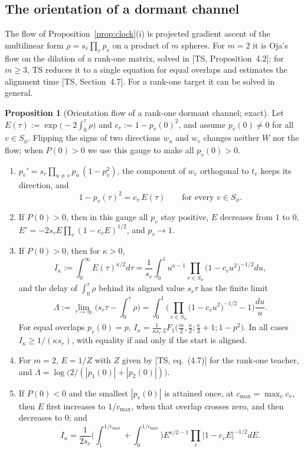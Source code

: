 \documentclass[11pt]{article}
\newcommand{\TS}{\textsf{TS}}
\newcommand{\ts}[1]{[\TS, #1]}
\theoremstyle{definition}
\newtheorem{proposition}[theorem]{Proposition}
\numberwithin{equation}{section}
\begin{document}
\subsection{The orientation of a dormant channel}

The flow of Proposition~\ref{prop:clock}(i) is projected gradient ascent of the multilinear form $\rho=s_r\prod_vp_v$ on a product of $m$ spheres. For $m=2$ it is Oja's flow on the dilation of a rank-one matrix, solved in \ts{Proposition~4.2}; for $m\ge3$, \TS{} reduces it to a single equation for equal overlaps and estimates the alignment time \ts{Section~4.7}. For a rank-one target it can be solved in general.

\begin{proposition}[Orientation flow of a rank-one dormant channel; exact]\label{prop:orientation}
Let $E(\tau):=\exp\big(-2\int_0^\tau\rho\big)$ and $c_v:=1-p_v(0)^2$, and assume $p_v(0)\neq0$ for all $v\in S_\phi$. Flipping the signs of two directions $w_u$ and $w_v$ changes neither $W$ nor the flow; when $P(0)>0$ we use this gauge to make all $p_v(0)>0$.
\begin{enumerate}[label=(\roman*),nosep]
\item $p_v'=s_r\prod_{u\neq v}p_u\,(1-p_v^2)$, the component of $w_v$ orthogonal to $t_v$ keeps its direction, and
\begin{equation}\label{eq:orientation-invariant}
1-p_v(\tau)^2=c_v\,E(\tau)\qquad\text{for every }v\in S_\phi.
\end{equation}
\item If $P(0)>0$, then in this gauge all $p_v$ stay positive, $E$ decreases from $1$ to $0$, $E'=-2s_rE\prod_v(1-c_vE)^{1/2}$, and $p_v\to1$.
\item If $P(0)>0$, then for $\kappa>0$,
\begin{equation}\label{eq:I-kappa}
I_\kappa:=\int_0^\infty E(\tau)^{\kappa/2}d\tau=\frac1{s_r}\int_0^1u^{\kappa-1}\prod_{v\in S_\phi}\big(1-c_vu^2\big)^{-1/2}du,
\end{equation}
and the delay of $\int_0^\tau\rho$ behind its aligned value $s_r\tau$ has the finite limit
\begin{equation}\label{eq:Lambda}
\Lambda:=\lim_{\tau\to\infty}\Big(s_r\tau-\int_0^\tau\rho\Big)=\int_0^1\Big(\prod_{v\in S_\phi}\big(1-c_vu^2\big)^{-1/2}-1\Big)\frac{du}u.
\end{equation}
For equal overlaps $p_v(0)=p$, $I_\kappa=\frac1{\kappa s_r}\,{}_2F_1\big(\tfrac m2,\tfrac\kappa2;\tfrac\kappa2+1;1-p^2\big)$. In all cases $I_\kappa\ge1/(\kappa s_r)$, with equality if and only if the start is aligned.
\item For $m=2$, $E=1/Z$ with $Z$ given by \ts{eq.~(4.7)} for the rank-one teacher, and $\Lambda=\log\big(2/(|p_1(0)|+|p_2(0)|)\big)$.
\item If $P(0)<0$ and the smallest $|p_v(0)|$ is attained once, at $c_{\max}=\max_vc_v$, then $E$ first increases to $1/c_{\max}$, when that overlap crosses zero, and then decreases to $0$; and
\[
I_\kappa=\frac1{2s_r}\Big(\int_1^{1/c_{\max}}+\int_0^{1/c_{\max}}\Big)E^{\kappa/2-1}\prod_v\big|1-c_vE\big|^{-1/2}dE.
\]
\end{enumerate}
\end{proposition}
\end{document}
